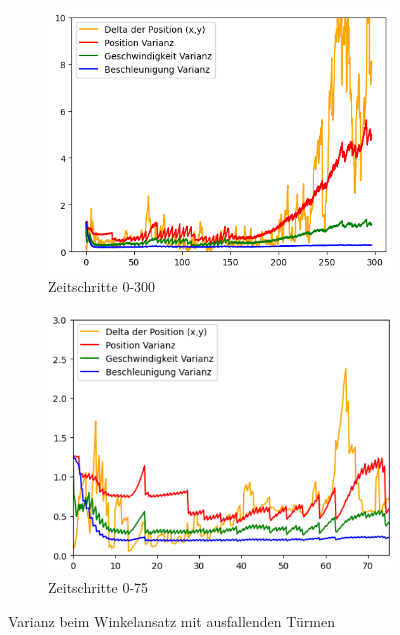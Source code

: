 \documentclass[conference]{IEEEtran}[10pt]
\begin{document}
\begin{figure}
    \begin{subfigure}{.5\textwidth}
        \centering
        \includegraphics[width=.9\linewidth]{Ergebnisse/plots_ungenauigkeiten/winkel/winkel_const_vel_flag_freq.png}
        \caption{Zeitschritte 0-300}
    \end{subfigure}
    \begin{subfigure}{.5\textwidth}
        \centering
        \includegraphics[width=.9\linewidth]{Ergebnisse/plots_ungenauigkeiten/winkel/winkel_ausschnitt.png}
        \caption{Zeitschritte 0-75}
        \label{subfig:varianz-closeup}
    \end{subfigure}
    \caption{Varianz beim Winkelansatz mit ausfallenden Türmen}
    \label{fig:varianz-visualisierung}
\end{figure}
\end{document}
